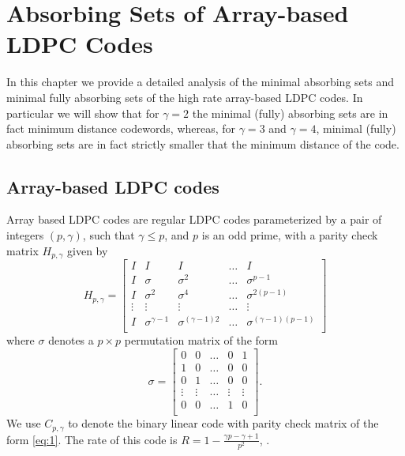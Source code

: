 \chapter[Absorbing Sets of Array-based LDPC Codes]{Absorbing Sets of Array-based LDPC
Codes}\label{arrayabs}

In this chapter we provide a detailed analysis of the  minimal
absorbing sets and minimal fully absorbing sets of the high rate
array-based LDPC codes. In particular we will show that for
$\gamma=2$ the minimal (fully) absorbing sets are in fact minimum
distance codewords, whereas, for $\gamma=3$ and $\gamma=4$, minimal
(fully) absorbing sets are in fact strictly smaller that the minimum
distance of the code.


\section{Array-based LDPC codes}




Array based LDPC codes \cite{fan} are regular LDPC codes
parameterized by a pair of integers $(p,\gamma)$, such that $\gamma
\leq p$, and $p$ is an odd prime, with a parity check matrix
$H_{p,\gamma}$ given by
\begin{equation}\label{eq:1}
H_{p,\gamma}=\left[\begin{array}{ccccc}
I & I & I & \ldots & I\\
I & \sigma & \sigma^2 & \ldots &\sigma^{p-1}\\
I & \sigma^2 & \sigma^4 & \ldots &\sigma^{2(p-1)}\\
\vdots & \vdots & \vdots & \ldots & \vdots \\
I & \sigma^{\gamma-1} & \sigma^{(\gamma-1)2} & \ldots &\sigma^{(\gamma-1)(p-1)}\\
\end{array}
\right]
\end{equation}\normalsize
where $\sigma$ denotes a $p \times p$ permutation matrix of the
form \small
\begin{equation}
\sigma=\left[\begin{array}{ccccc}
0 & 0 & \ldots & 0 & 1\\
1 & 0 & \ldots & 0 & 0\\
0 & 1 & \ldots & 0 & 0\\
\vdots & \vdots & \ldots & \vdots & \vdots\\
0 & 0 & \ldots & 1 & 0\\
\end{array}
\right].
\end{equation}
\normalsize We use $C_{p,\gamma}$ to denote the binary linear code
with parity check matrix of the form \eqref{eq:1}. The rate of
this code is $R=1-\frac{\gamma p-\gamma+1}{p^2}$,
\cite{mittel:02}.

